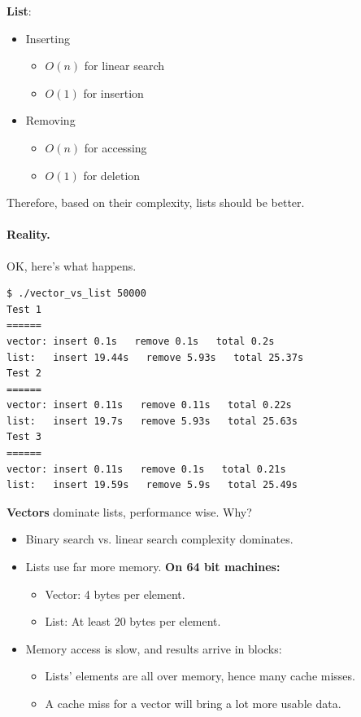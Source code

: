 \documentclass[a4paper]{report}
\begin{document}
{\bf List}:\\[-2em]
      \begin{itemize}
        \item Inserting\\[-2em]
          \begin{itemize}
            \item $O(n)$ for linear search
            \item $O(1)$ for insertion
          \end{itemize}
        \item Removing\\[-2em]
          \begin{itemize}
            \item $O(n)$ for accessing
            \item $O(1)$ for deletion
          \end{itemize}
      \end{itemize}

Therefore, based on their complexity, lists should be better.

\paragraph{Reality.} OK, here's what happens. 
\begin{verbatim}
$ ./vector_vs_list 50000
Test 1
======
vector: insert 0.1s   remove 0.1s   total 0.2s
list:   insert 19.44s   remove 5.93s   total 25.37s
Test 2
======
vector: insert 0.11s   remove 0.11s   total 0.22s
list:   insert 19.7s   remove 5.93s   total 25.63s
Test 3
======
vector: insert 0.11s   remove 0.1s   total 0.21s
list:   insert 19.59s   remove 5.9s   total 25.49s
\end{verbatim}

{\bf Vectors} dominate lists, performance wise. Why?
  \begin{itemize}
    \item Binary search vs. linear search complexity dominates.
    \item Lists use far more memory.
      {\bf On 64 bit machines:}
      \begin{itemize}
        \item Vector: 4 bytes per element.
        \item List: At least 20 bytes per element.
      \end{itemize}
    \item Memory access is slow, and results arrive in blocks:
      \begin{itemize}
        \item Lists' elements are all over memory, hence many
          cache misses.
        \item A cache miss for a vector will bring a lot more usable data.
      \end{itemize}
  \end{itemize}
\end{document}
